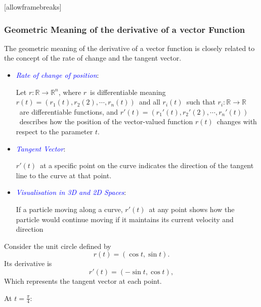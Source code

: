 \documentclass{beamer}
\begin{document}
{\newpage\clearpage
{}%
\begin{frame}
[allowframebreaks]
\frametitle{Geometric Meaning of the derivative of a vector Function}
\par
The geometric meaning of the derivative of a vector function is closely related to the concept of the rate of change and the tangent vector.
\begin{itemize}
\item \textcolor{blue}{\textit{Rate of change of position}}:
\par
\begin{block}{}
    Let $r:\mathbb{R}\rightarrow \mathbb{R}^n$, where $r$\  is differentiable meaning $r(t)=(r_1(t),r_2(2),\cdots ,r_n(t))$\  and all $r_i(t)$\  such that $r_i:\mathbb{R}\rightarrow \mathbb{R}$\  are differentiable functions, and $r'(t)=(r_1'(t),r_2'(2),\cdots ,r_n'(t))$\  describes how the position of the vector-valued function $r(t)$\  changes with respect to the parameter $t$.
\end{block}
\par
\item \textcolor{blue}{\textit{Tangent Vector}}: 
\par
\begin{block}{}
    $r'(t)$\  at a specific point on the curve indicates the direction of the tangent line to the curve at that point.
\end{block}
\par
\item \textcolor{blue}{\textit{Visualisation in 3D and 2D Spaces}}: \\
\begin{block}{}
    If a particle moving along a curve, $r'(t)$\  at any point shows how the particle would continue moving if it maintains its current velocity and direction
\end{block}
\par
\end{itemize} 
Consider the unit circle defined by 
  \begin{displaymath}
  r(t) = (\cos t, \sin t).
  \end{displaymath}
  Its derivative is 
  \begin{displaymath}
  r'(t) = (-\sin t, \cos t),
  \end{displaymath}
  Which represents the tangent vector at each point.
\par
At \(t=\frac{\pi}{4}\):
  \begin{displaymath}

\end{displaymath}
\end{frame}}
\end{document}

